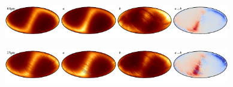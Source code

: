 \documentclass{aa}
\begin{document}
\begin{figure}
    \includegraphics[width=0.22\textwidth]{figs/zodi/zodi_07_tot.pdf}\includegraphics[width=0.22\textwidth]{figs/zodi/zodi_07_a.pdf}\includegraphics[width=0.22\textwidth]{figs/zodi/zodi_04_b.pdf}\includegraphics[width=0.22\textwidth]{figs/zodi/zodi_07_a-b.pdf}
    \vspace{-0.3cm}

    \includegraphics[width=0.22\textwidth]{figs/zodi/zodi_06_tot.pdf}\includegraphics[width=0.22\textwidth]{figs/zodi/zodi_06_a.pdf}\includegraphics[width=0.22\textwidth]{figs/zodi/zodi_05_b.pdf}\includegraphics[width=0.22\textwidth]{figs/zodi/zodi_06_a-b.pdf}
    \vspace{-0.3cm}


\end{figure}
\end{document}
